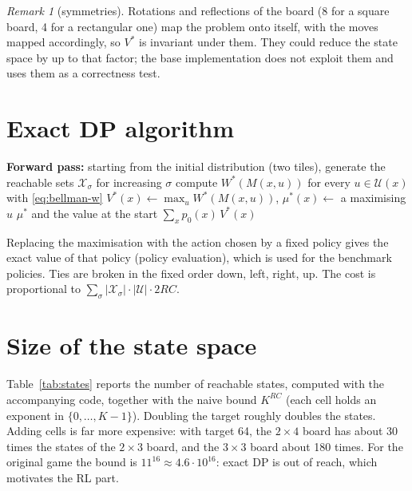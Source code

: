 \documentclass[11pt,a4paper]{article}
\theoremstyle{remark}
\newtheorem*{remark}{Remark}
\newcommand{\X}{\mathcal{X}}
\newcommand{\U}{\mathcal{U}}
\newcommand{\act}[1]{\textsf{#1}}
\begin{document}
\begin{remark}[symmetries]
Rotations and reflections of the board (8 for a square board, 4 for a rectangular one) map the problem onto itself, with the moves mapped accordingly, so $V^*$ is invariant under them. They could reduce the state space by up to that factor; the base implementation does not exploit them and uses them as a correctness test.
\end{remark}

\section{Exact DP algorithm}

\begin{algorithm}[h]
\caption{Exact DP by stages}
\begin{algorithmic}[1]
\State \textbf{Forward pass:} starting from the initial distribution (two tiles), generate the reachable sets $\X_\sigma$ for increasing $\sigma$
 
  \For{each $x\in\X_\sigma$}
    \State compute $W^*(M(x,u))$ for every $u\in\U(x)$ with \eqref{eq:bellman-w} \Comment{uses $V^*$ on $\X_{\sigma+2}\cup\X_{\sigma+4}$}
    \State $V^*(x)\gets\max_{u}W^*(M(x,u))$, \quad $\mu^*(x)\gets$ a maximising $u$ \Comment{$V^*(x)=0$ if $\U(x)=\emptyset$}
  \EndFor
\EndFor
\State \Return $\mu^*$ and the value at the start $\sum_{x}p_0(x)\,V^*(x)$
\end{algorithmic}
\end{algorithm}

Replacing the maximisation with the action chosen by a fixed policy gives the exact value of that policy (policy evaluation), which is used for the benchmark policies. Ties are broken in the fixed order \act{down}, \act{left}, \act{right}, \act{up}. The cost is proportional to $\sum_\sigma|\X_\sigma|\cdot|\U|\cdot 2RC$.

\section{Size of the state space}

Table~\ref{tab:states} reports the number of reachable states, computed with the accompanying code, together with the naive bound $K^{RC}$ (each cell holds an exponent in $\{0,\dots,K-1\}$). Doubling the target roughly doubles the states. Adding cells is far more expensive: with target 64, the $2\times4$ board has about 30 times the states of the $2\times3$ board, and the $3\times3$ board about 180 times. For the original game the bound is $11^{16}\approx4.6\cdot10^{16}$: exact DP is out of reach, which motivates the RL part.
\end{document}
